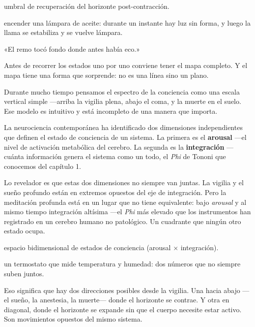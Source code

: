 \begin{fisica}
 umbral de recuperación del horizonte post-contracción.

 encender una lámpara de aceite: durante un instante hay luz sin forma, y luego la llama se estabiliza y se vuelve lámpara.
\end{fisica}
\begin{cita}
«El remo tocó fondo donde antes había eco.»
\end{cita}
\noindent Antes de recorrer los estados uno por uno conviene tener el mapa completo. Y el mapa tiene una forma que sorprende: no es una línea sino un plano.

Durante mucho tiempo pensamos el espectro de la conciencia como una escala vertical simple —arriba la vigilia plena, abajo el coma, y la muerte en el suelo. Ese modelo es intuitivo y está incompleto de una manera que importa.

La neurociencia contemporánea ha identificado dos dimensiones independientes que definen el estado de conciencia de un sistema. La primera es el \textbf{arousal} —el nivel de activación metabólica del cerebro. La segunda es la \textbf{integración} —cuánta información genera el sistema como un todo, el \emph{Phi} de Tononi que conocemos del capítulo 1.

Lo revelador es que estas dos dimensiones no siempre van juntas. La vigilia y el sueño profundo están en extremos opuestos del eje de integración. Pero la meditación profunda está en un lugar que no tiene equivalente: bajo \emph{arousal} y al mismo tiempo integración altísima —el \emph{Phi} más elevado que los instrumentos han registrado en un cerebro humano no patológico. Un cuadrante que ningún otro estado ocupa.

\begin{fisica}
 espacio bidimensional de estados de conciencia (arousal × integración).

 un termostato que mide temperatura y humedad: dos números que no siempre suben juntos.
\end{fisica}
Eso significa que hay dos direcciones posibles desde la vigilia. Una hacia abajo —el sueño, la anestesia, la muerte— donde el horizonte se contrae. Y otra en diagonal, donde el horizonte se expande sin que el cuerpo necesite estar activo. Son movimientos opuestos del mismo sistema.

